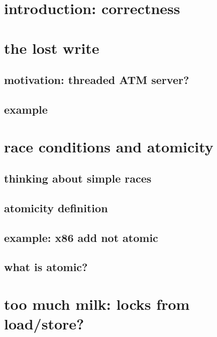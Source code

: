 
\section{introduction: correctness}




\section{the lost write}

\subsection{motivation: threaded ATM server?}


\subsection{example}


\section{race conditions and atomicity}
\subsection{thinking about simple races} 


\subsection{atomicity definition}


\subsection{example: x86 add not atomic}


\subsection{what is atomic?}


\section{too much milk: locks from load/store?}

